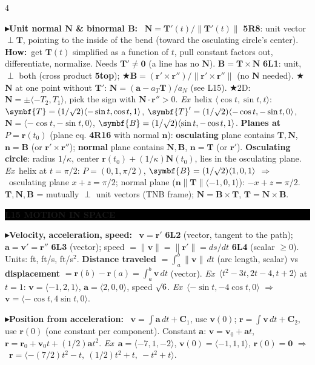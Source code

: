 \documentclass{article}
\newcommand\vb[1]{\symbf{#1}}                 %
\newcommand\nm[1]{\lVert #1\rVert}            %
\newcommand\ip[1]{\langle #1\rangle}          %
\newcommand\sh[1]{{\setlength\fboxsep{0.18pt}\colorbox{black!22}{\textbf{#1}}}} %
\newcommand\hd[1]{\par\vspace{0.5pt}\needspace{4\baselineskip}\noindent
  {\setlength\fboxsep{0.45pt}\colorbox{black}{\parbox{\dimexpr\linewidth-2\fboxsep}{\color{white}\bfseries #1}}}\par\nobreak\vspace{0.2pt}\nobreak}
\newcommand\pt[1]{\par\textbf{{\symf ▸}#1}\ }  %
\newcommand\ex{\textit{Ex}\ }                  %
\newcommand\how{\textbf{How:}\ }
\newcommand\shc{{\symf ★}}                      %
\newcommand\rt{\smash{\surd}}               %
\newcommand\then{\ensuremath{\Rightarrow}}
\begin{document}
\begin{multicols*}{4}
\pt{Unit normal $\vb N$ \& binormal $\vb B$:} $\vb N=\vb T'(t)/\nm{\vb T'(t)}$ \sh{5R8}: unit vector $\perp\vb T$, pointing to the inside of the bend (toward the osculating circle's center). \how get $\vb T(t)$ simplified as a function of $t$, pull constant factors out, differentiate, normalize. Needs $\vb T'\ne\vb0$ (a line has no $\vb N$). $\vb B=\vb T\times\vb N$ \sh{6L1}: unit, $\perp$ both (cross product \sh{5top}); \shc $\vb B=(\vb r'\times\vb r'')/\nm{\vb r'\times\vb r''}$ (no $\vb N$ needed). \shc $\vb N$ at one point without $\vb T'$: $\vb N=(\vb a-a_T\vb T)/a_N$ (see L15). \shc 2D: $\vb N=\pm\ip{-T_2,T_1}$, pick the sign with $\vb N\cdot\vb r''>0$. \ex helix $\ip{\cos t,\sin t,t}$: $\vb T=(1/\rt2)\ip{-\sin t,\cos t,1}$, $\vb T'=(1/\rt2)\ip{-\cos t,-\sin t,0}$, $\vb N=\ip{-\cos t,-\sin t,0}$, $\vb B=(1/\rt2)\ip{\sin t,-\cos t,1}$. \textbf{Planes at $P=\vb r(t_0)$} (plane eq. \sh{4R16} with normal $\vb n$): \textbf{osculating} plane contains $\vb T,\vb N$, $\vb n=\vb B$ (or $\vb r'\times\vb r''$); \textbf{normal} plane contains $\vb N,\vb B$, $\vb n=\vb T$ (or $\vb r'$). \textbf{Osculating circle}: radius $1/\kappa$, center $\vb r(t_0)+(1/\kappa)\vb N(t_0)$, lies in the osculating plane. \ex helix at $t=\pi/2$: $P=(0,1,\pi/2)$, $\vb B=(1/\rt2)\ip{1,0,1}$ \then\ osculating plane $x+z=\pi/2$; normal plane ($\vb n\parallel\vb T\parallel\ip{-1,0,1}$): $-x+z=\pi/2$. $\vb T,\vb N,\vb B$ = mutually $\perp$ unit vectors (TNB frame); $\vb N=\vb B\times\vb T$, $\vb T=\vb N\times\vb B$.

\hd{L15 MOTION IN SPACE}
\pt{Velocity, acceleration, speed:} $\vb v=\vb r'$ \sh{6L2} (vector, tangent to the path); $\vb a=\vb v'=\vb r''$ \sh{6L3} (vector); speed $=\nm{\vb v}=\nm{\vb r'}=ds/dt$ \sh{6L4} (scalar $\ge0$). Units: ft, ft/s, ft/s$^2$. \textbf{Distance traveled} $=\int_a^b\nm{\vb v}\,dt$ (arc length, scalar) vs \textbf{displacement} $=\vb r(b)-\vb r(a)=\int_a^b\vb v\,dt$ (vector). \ex $\ip{t^2-3t,2t-4,t+2}$ at $t=1$: $\vb v=\ip{-1,2,1}$, $\vb a=\ip{2,0,0}$, speed $\rt6$. \ex $\ip{-\sin t,-4\cos t,0}$ \then\ $\vb v=\ip{-\cos t,4\sin t,0}$.

\pt{Position from acceleration:} $\vb v=\int\vb a\,dt+\vb C_1$, use $\vb v(0)$; $\vb r=\int\vb v\,dt+\vb C_2$, use $\vb r(0)$ (one constant per component). Constant $\vb a$: $\vb v=\vb v_0+\vb a t$, $\vb r=\vb r_0+\vb v_0t+(1/2)\vb at^2$. \ex $\vb a=\ip{-7,1,-2}$, $\vb v(0)=\ip{-1,1,1}$, $\vb r(0)=\vb0$ \then\ $\vb r=\ip{-(7/2)t^2-t,\ (1/2)t^2+t,\ -t^2+t}$.


\end{multicols*}
\end{document}
